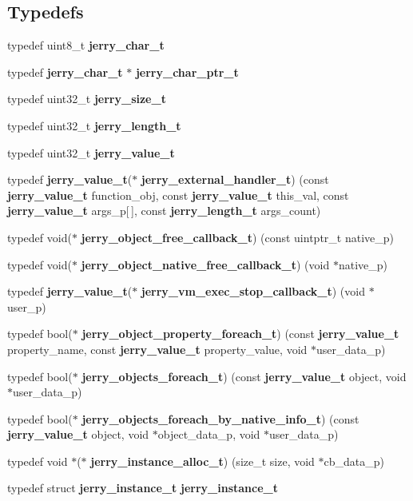 \subsection*{Typedefs}
\begin{DoxyCompactItemize}
\item 
typedef uint8\+\_\+t \textbf{ jerry\+\_\+char\+\_\+t}
\item 
typedef \textbf{ jerry\+\_\+char\+\_\+t} $\ast$ \textbf{ jerry\+\_\+char\+\_\+ptr\+\_\+t}
\item 
typedef uint32\+\_\+t \textbf{ jerry\+\_\+size\+\_\+t}
\item 
typedef uint32\+\_\+t \textbf{ jerry\+\_\+length\+\_\+t}
\item 
typedef uint32\+\_\+t \textbf{ jerry\+\_\+value\+\_\+t}
\item 
typedef \textbf{ jerry\+\_\+value\+\_\+t}($\ast$ \textbf{ jerry\+\_\+external\+\_\+handler\+\_\+t}) (const \textbf{ jerry\+\_\+value\+\_\+t} function\+\_\+obj, const \textbf{ jerry\+\_\+value\+\_\+t} this\+\_\+val, const \textbf{ jerry\+\_\+value\+\_\+t} args\+\_\+p[$\,$], const \textbf{ jerry\+\_\+length\+\_\+t} args\+\_\+count)
\item 
typedef void($\ast$ \textbf{ jerry\+\_\+object\+\_\+free\+\_\+callback\+\_\+t}) (const uintptr\+\_\+t native\+\_\+p)
\item 
typedef void($\ast$ \textbf{ jerry\+\_\+object\+\_\+native\+\_\+free\+\_\+callback\+\_\+t}) (void $\ast$native\+\_\+p)
\item 
typedef \textbf{ jerry\+\_\+value\+\_\+t}($\ast$ \textbf{ jerry\+\_\+vm\+\_\+exec\+\_\+stop\+\_\+callback\+\_\+t}) (void $\ast$user\+\_\+p)
\item 
typedef bool($\ast$ \textbf{ jerry\+\_\+object\+\_\+property\+\_\+foreach\+\_\+t}) (const \textbf{ jerry\+\_\+value\+\_\+t} property\+\_\+name, const \textbf{ jerry\+\_\+value\+\_\+t} property\+\_\+value, void $\ast$user\+\_\+data\+\_\+p)
\item 
typedef bool($\ast$ \textbf{ jerry\+\_\+objects\+\_\+foreach\+\_\+t}) (const \textbf{ jerry\+\_\+value\+\_\+t} object, void $\ast$user\+\_\+data\+\_\+p)
\item 
typedef bool($\ast$ \textbf{ jerry\+\_\+objects\+\_\+foreach\+\_\+by\+\_\+native\+\_\+info\+\_\+t}) (const \textbf{ jerry\+\_\+value\+\_\+t} object, void $\ast$object\+\_\+data\+\_\+p, void $\ast$user\+\_\+data\+\_\+p)
\item 
typedef void $\ast$($\ast$ \textbf{ jerry\+\_\+instance\+\_\+alloc\+\_\+t}) (size\+\_\+t size, void $\ast$cb\+\_\+data\+\_\+p)
\item 
typedef struct \textbf{ jerry\+\_\+instance\+\_\+t} \textbf{ jerry\+\_\+instance\+\_\+t}
\end{DoxyCompactItemize}
